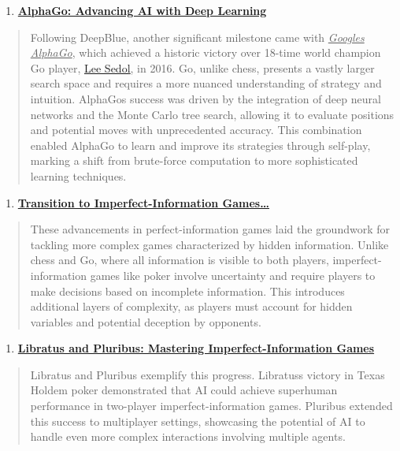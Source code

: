 \documentclass[
]{article}
\begin{document}
\begin{enumerate}
\def\labelenumi{\arabic{enumi}.}
\setcounter{enumi}{1}
\item
  \textbf{\ul{AlphaGo: Advancing AI with Deep Learning}}
\end{enumerate}

\begin{quote}
Following DeepBlue, another significant milestone came with
\emph{\ul{Google\textquotesingle s AlphaGo}}, which achieved a historic
victory over 18-time world champion Go player,
\href{https://en.wikipedia.org/wiki/Lee_Sedol}{\ul{Lee Sedol}}, in 2016.
Go, unlike chess, presents a vastly larger search space and requires a
more nuanced understanding of strategy and intuition.
AlphaGo\textquotesingle s success was driven by the integration of deep
neural networks and the Monte Carlo tree search, allowing it to evaluate
positions and potential moves with unprecedented accuracy. This
combination enabled AlphaGo to learn and improve its strategies through
self-play, marking a shift from brute-force computation to more
sophisticated learning techniques.
\end{quote}

\begin{enumerate}
\def\labelenumi{\arabic{enumi}.}
\setcounter{enumi}{2}
\item
  \textbf{\ul{Transition to Imperfect-Information Games\ldots{}}}
\end{enumerate}

\begin{quote}
These advancements in perfect-information games laid the groundwork for
tackling more complex games characterized by hidden information. Unlike
chess and Go, where all information is visible to both players,
imperfect-information games like poker involve uncertainty and require
players to make decisions based on incomplete information. This
introduces additional layers of complexity, as players must account for
hidden variables and potential deception by opponents.
\end{quote}

\begin{enumerate}
\def\labelenumi{\arabic{enumi}.}
\setcounter{enumi}{3}
\item
  \textbf{\ul{Libratus and Pluribus: Mastering Imperfect-Information
  Games}}
\end{enumerate}

\begin{quote}
Libratus and Pluribus exemplify this progress.
Libratus\textquotesingle s victory in Texas Hold\textquotesingle em
poker demonstrated that AI could achieve superhuman performance in
two-player imperfect-information games. Pluribus extended this success
to multiplayer settings, showcasing the potential of AI to handle even
more complex interactions involving multiple agents.
\end{quote}
\end{document}

